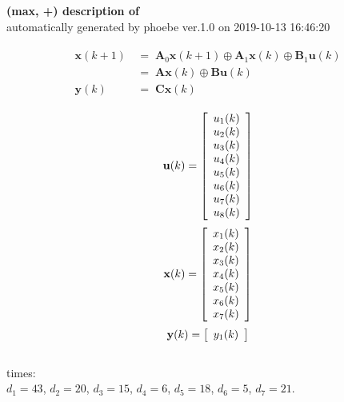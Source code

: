 \documentclass[11pt, a4paper, fleqn]{article}
\begin{document}
\noindent
\textbf{(max, +) description of} \texttt{\currfilebase} \\
automatically generated by phoebe ver.1.0 on 2019-10-13 16:46:20 

\begin{align}\begin{split}
\mathbf{x}(k+1) & \, = \; \mathbf{A}_{0}\mathbf{x}(k+1) \oplus \mathbf{A}_{1}\mathbf{x}(k) \oplus \mathbf{B}_{1}\mathbf{u}(k)\\
& \, = \; \mathbf{Ax}(k) \oplus \mathbf{Bu}(k)\\
\mathbf{y}(k) & \, = \; \mathbf{Cx}(k)
\end{split}\end{align}

\begin{equation*}
\mathbf{u}(k) = 
\left[\begin{array}{*{20}c}
  u_1(k) \\
  u_2(k) \\
  u_3(k) \\
  u_4(k) \\
  u_5(k) \\
  u_6(k) \\
  u_7(k) \\
  u_8(k) \\
\end{array}\right]
\end{equation*}
\begin{equation*}
\mathbf{x}(k) = 
\left[\begin{array}{*{20}c}
  x_1(k) \\
  x_2(k) \\
  x_3(k) \\
  x_4(k) \\
  x_5(k) \\
  x_6(k) \\
  x_7(k) \\
\end{array}\right]
\end{equation*}
\begin{equation*}
\mathbf{y}(k) = 
\left[\begin{array}{*{20}c}
  y_1(k) \\
\end{array}\right]
\end{equation*}
\noindent\\
times:\\
$d_1 = 43$, $d_2 = 20$, $d_3 = 15$, $d_4 = 6$, $d_5 = 18$, $d_6 = 5$, $d_7 = 21$.\\
\end{document}
